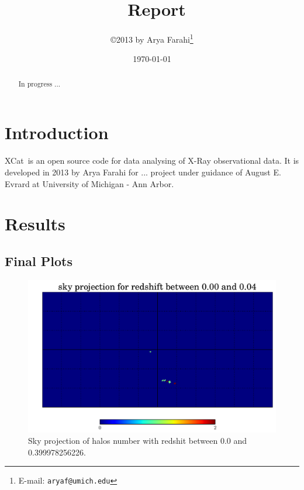 \documentclass[12pt]{article}
\title{\XCat\ Report}
\author{\copyright 2013 by Arya Farahi\thanks{E-mail: {\tt aryaf@umich.edu}}}
\date{\today}
\def\XCat{{\sc XCat}}
\begin{document}
\maketitle

\begin{abstract}
In progress ...
\end{abstract}


\section{Introduction}

\XCat\ is an open source code for data analysing of X-Ray observational data. It is developed in 2013 by Arya Farahi for ... project under guidance of August E. Evrard at University of Michigan - Ann Arbor.


 
\section{Results}
\subsection{Final Plots} 


\begin{figure}
  \centering
  \includegraphics[width=12cm]{./Output/plots/HEALPix/sky_projection_HEALPix_Count_32_1.pdf}
  \caption{Sky projection of halos number with redshit between 0.0 and 0.399978256226.}
  \label{fig:S-ProjCount-1}
\end{figure}
\end{document}

